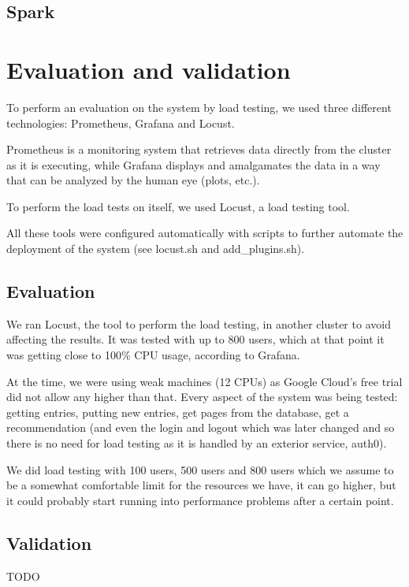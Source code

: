 \documentclass[oneside]{article}
\newcommand*\fpar{\hspace{1ex}}
\begin{document}
    \subsection{Spark}


\section{Evaluation and validation}
\label{sec:evaluation_and_validation}
\fpar To perform an evaluation on the system by load testing, we used three different technologies: Prometheus, Grafana and Locust. 
\par Prometheus is a monitoring system that retrieves data directly from the cluster as it is executing, while Grafana displays and amalgamates the data in a way that can be analyzed by the human eye (plots, etc.). 
\par To perform the load tests on itself, we used Locust, a load testing tool. 
\par All these tools were configured automatically with scripts to further automate the deployment of the system (see locust.sh and add\_plugins.sh).

  \subsection{Evaluation}
  \label{sec:evaluation}
  \fpar We ran Locust, the tool to perform the load testing, in another cluster to avoid affecting the results. It was tested with up to 800 users, which at that point it was getting close to 100\% CPU usage, according to Grafana. 
  \par At the time, we were using weak machines (12 CPUs) as Google Cloud's free trial did not allow any higher than that. Every aspect of the system was being tested: getting entries, putting new entries, get pages from the database, get a recommendation (and even the login and logout which was later changed and so there is no need for load testing as it is handled by an exterior service, auth0). 
  \par We did load testing with 100 users, 500 users and 800 users which we assume to be a somewhat comfortable limit for the resources we have, it can go higher, but it could probably start running into performance problems after a certain point.

  \subsection{Validation}
  \label{sec:validation}
  \fpar TODO
\end{document}
